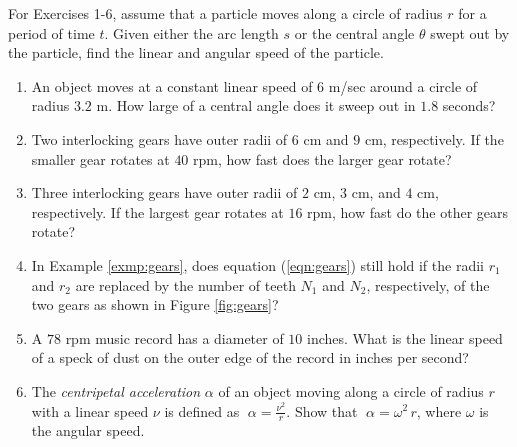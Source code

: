 \startexercises\label{sec4dot4}
\vspace{5mm}
{\small
\par\noindent For Exercises 1-6, assume that a particle moves along a circle of radius $r$ for a
period of time $t$. Given either the arc length $s$ or the central angle $\theta$ swept out by the
particle, find the linear and angular speed of the particle.
\begin{enumerate}[\bfseries 1.]
 \item An object moves at a constant linear speed of $6$ m/sec around a circle of radius $3.2$ m.
  How large of a central angle does it sweep out in $1.8$ seconds?
 \item Two interlocking gears have outer radii of $6$ cm and $9$ cm, respectively. If the smaller
  gear rotates at $40$ rpm, how fast does the larger gear rotate?
 \item Three interlocking gears have outer radii of $2$ cm, $3$ cm, and $4$ cm, respectively. If the
  largest gear rotates at $16$ rpm, how fast do the other gears rotate?
 \item In Example \ref{exmp:gears}, does equation (\ref{eqn:gears}) still hold if the radii
  $r_1$ and $r_2$ are replaced by the number of teeth  $N_1$ and $N_2$, respectively, of the two
  gears as shown in Figure \ref{fig:gears}?
 \item A $78$ rpm music record has a diameter of $10$ inches. What is the linear speed of a speck
  of dust on the outer edge of the record in inches per second?
 \item The \emph{centripetal acceleration} $\alpha$ of an object
  moving along a circle of radius $r$ with a linear speed $\nu$ is defined as $\;\alpha =
  \frac{\nu^2}{r}$. Show that $\;\alpha = \omega^2 \,r$, where $\omega$ is the angular speed.
\end{enumerate}}

